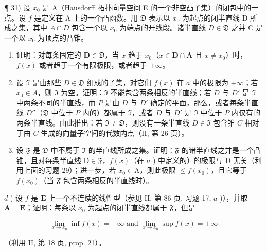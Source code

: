 ¶ 31) 设 \(x_0\) 是 A（Hausdorff 拓扑向量空间 E 的一个非空凸子集）的闭包中的一点。设 \(f\) 是定义在 A 上的一个凸函数。用 \(\mathfrak{D}\) 表示以 \(x_0\) 为起点的闭半直线 D 所成之集，其中 \(A \cap D\) 包含一个以 \(x_0\) 为端点的开线段。诸半直线 \(D \in \mathfrak{D}\) 之并 C 是一个以 \(x_0\) 为顶点的凸锥。

\begin{enumerate}
\def\labelenumi{\alph{enumi})}
\item
  证明：对每条固定的 \(\mathbf{D} \in \mathfrak{D}\)，当 \(x\) 趋于 \(x_0\)（\(x \in \mathbf{D} \cap \mathbf{A}\) 且 \(x \neq x_0\)）时，\(f(x)\) 或者趋于一个有限极限，或者趋于 \(+\infty\)。
\item
  设 \(\mathfrak{I}\) 是由那些 \(D \in \mathfrak{D}\) 组成的子集，对它们 \(f(x)\) 在 \(a\) 中的极限为 \(+\infty\)；若 \(x_0 \in A\)，则 \(\mathfrak{I}\) 为空。证明：\(\mathfrak{I}\) 不能包含两条相反的半直线；若 \(D\) 与 \(D'\) 是 \(\mathfrak{I}\) 中两条不同的半直线，而 \(P\) 是由 \(D\) 与 \(D'\) 确定的平面，那么，或者每条半直线 \(D''\)（\(\mathfrak{D}\) 中位于 \(P\) 内的）都属于 \(\mathfrak{I}\)，或者 \(D\) 与 \(D'\) 是 \(\mathfrak{I}\) 中位于 \(P\) 内仅有的两条半直线。由此推出：若 \(\mathfrak{I} \neq \mathfrak{D}\)，则没有一条半直线 \(D \in \mathfrak{I}\) 包含锥 \(C\) 相对于由 \(C\) 生成的向量子空间的代数内点（II, 第 26 页）。
\item
  设 \(\mathfrak{F}\) 是 \(\mathfrak{D}\) 中不属于 \(\mathfrak{I}\) 的半直线所成之集。证明：\(\mathfrak{F}\) 的诸半直线之并是一个凸锥，且对每条半直线 \(\mathrm{D} \in \mathfrak{F}\)，\(f(x)\)（在 \(a\) ) 中定义的）的极限与 \(\mathrm{D}\) 无关（利用上面的习题 29）；进一步，若 \(x_0 \in \mathrm{A}\)，则此极限 \(\leqslant f(x_0)\)，且它等于 \(f(x_0)\)（当 \(\mathfrak{F}\) 包含两条相反的半直线时）。
\end{enumerate}

\(d\) ) 设 \(f\) 是 \(\mathbf{E}\) 上一个不连续的线性型（参见 II, 第 86 页, 习题 17, \(a\) )），并取 \(\mathbf{A} = \mathbf{E}\)；证明：每条以 \(x_0\) 为起点的闭半直线都属于 \(\mathfrak{F}\)，但是

\[
\lim _ {x \to x _ {0}} \inf f (x) = - \infty \text { and } \lim _ {x \to x _ {0}} \sup f (x) = + \infty
\]

（利用 II, 第 18 页, prop. 21）。

